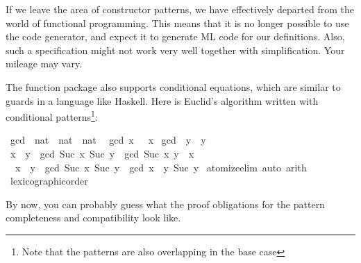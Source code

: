 \begin{isabellebody}
\begin{isamarkuptext}
  If we leave the area of constructor
  patterns, we have effectively departed from the world of functional
  programming. This means that it is no longer possible to use the
  code generator, and expect it to generate ML code for our
  definitions. Also, such a specification might not work very well together with
  simplification. Your mileage may vary.%
\end{isamarkuptext}%
\isamarkuptrue%
%
\isamarkuptrue%
%
\begin{isamarkuptext}%
The function package also supports conditional equations, which are
  similar to guards in a language like Haskell. Here is Euclid's
  algorithm written with conditional patterns\footnote{Note that the
  patterns are also overlapping in the base case}:%
\end{isamarkuptext}%
\isamarkuptrue%
\isamarkupfalse%
\ gcd\ {\isacharcolon}{\isacharcolon}\ {\isachardoublequoteopen}nat\ {\isasymRightarrow}\ nat\ {\isasymRightarrow}\ nat{\isachardoublequoteclose}\isanewline
{}\isanewline
\ \ {\isachardoublequoteopen}gcd\ x\ {}\ {\isacharequal}\ x{\isachardoublequoteclose}\isanewline
{\isacharbar}\ {\isachardoublequoteopen}gcd\ {}\ y\ {\isacharequal}\ y{\isachardoublequoteclose}\isanewline
{\isacharbar}\ {\isachardoublequoteopen}x\ {\isacharless}\ y\ {\isasymLongrightarrow}\ gcd\ {\isacharparenleft}Suc\ x{\isacharparenright}\ {\isacharparenleft}Suc\ y{\isacharparenright}\ {\isacharequal}\ gcd\ {\isacharparenleft}Suc\ x{\isacharparenright}\ {\isacharparenleft}y\ {\isacharminus}\ x{\isacharparenright}{\isachardoublequoteclose}\isanewline
{\isacharbar}\ {\isachardoublequoteopen}{\isasymnot}\ x\ {\isacharless}\ y\ {\isasymLongrightarrow}\ gcd\ {\isacharparenleft}Suc\ x{\isacharparenright}\ {\isacharparenleft}Suc\ y{\isacharparenright}\ {\isacharequal}\ gcd\ {\isacharparenleft}x\ {\isacharminus}\ y{\isacharparenright}\ {\isacharparenleft}Suc\ y{\isacharparenright}{\isachardoublequoteclose}\isanewline
%
\isadelimproof
%
\endisadelimproof
%
\isatagproof
{}\isamarkupfalse%
\ {\isacharparenleft}atomize{\isacharunderscore}elim{\isacharcomma}\ auto{\isacharcomma}\ arith{\isacharparenright}%
\endisatagproof
{\isafoldproof}%
%
\isadelimproof
\isanewline
%
\endisadelimproof
{}\isamarkupfalse%
%
\isadelimproof
\ %
\endisadelimproof
%
\isatagproof
{}\isamarkupfalse%
\ lexicographic{\isacharunderscore}order%
\endisatagproof
{\isafoldproof}%
%
\isadelimproof
%
\endisadelimproof
%
\begin{isamarkuptext}%
By now, you can probably guess what the proof obligations for the
  pattern completeness and compatibility look like. 


\end{isamarkuptext}
\end{isabellebody}
